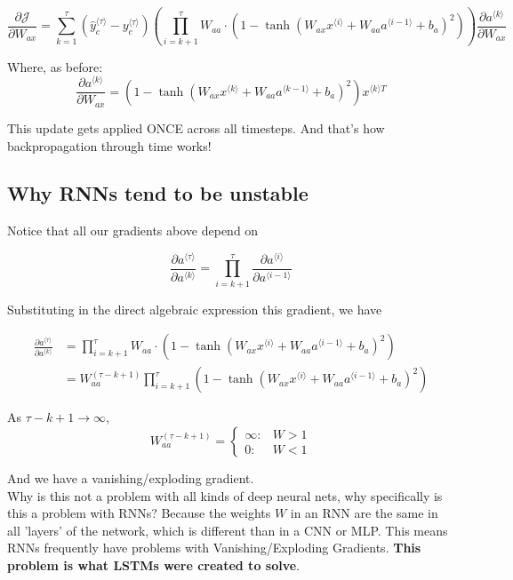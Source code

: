 \documentclass[12pt]{article}
\begin{document}
\[\frac{\partial \mathcal{J}}{\partial W_{ax}} = \sum_{k=1}^{\tau} \left( \hat{y}_c^{\langle \tau \rangle} - y_c^{\langle \tau \rangle}  \right) \left( \prod_{i=k+1}^{\tau}W_{aa} \cdot (1-\tanh(W_{ax}x^{\langle i \rangle} +W_{aa}a^{\langle i-1\rangle}+b_a)^2) \right) \frac{\partial a^{\langle k \rangle}}{\partial W_{ax}}\]

Where, as before: 
\[\frac{\partial a^{\langle k \rangle}}{\partial W_{ax}} = (1 - \tanh(W_{ax}x^{\langle k \rangle} + W_{aa}a^{\langle k-1\rangle} + b_a)^2) x^{\langle k \rangle T}\] 

This update gets applied ONCE across all timesteps. And that's how backpropagation through time works!

\subsection{Why RNNs tend to be unstable}

Notice that all our gradients above depend on 

\[\frac{\partial a^{\langle \tau \rangle}}{\partial a^{\langle k \rangle}} = \prod_{i=k+1}^{\tau} \frac{\partial a ^{\langle i \rangle}}{\partial a ^{\langle i - 1 \rangle}}\]


Substituting in the direct algebraic expression this gradient, we have

\begin{align*}
\frac{\partial a^{\langle \tau \rangle}}{\partial a^{\langle k \rangle}} &= \prod_{i=k+1}^{\tau}W_{aa} \cdot (1-\tanh(W_{ax}x^{\langle i \rangle} +W_{aa}a^{\langle i-1\rangle}+b_a)^2) \\
&= W_{aa}^{(\tau - k + 1)}\prod_{i=k+1}^{\tau}(1-\tanh(W_{ax}x^{\langle i \rangle} +W_{aa}a^{\langle i-1\rangle}+b_a)^2)
\end{align*}

As \(\tau - k + 1 \rightarrow \infty\), 
\[W_{aa}^{(\tau - k + 1)} = \begin{cases} \infty: & W > 1 \\ 0: & W<1 \end{cases}\]

And we have a vanishing/exploding gradient.\\

Why is this not a problem with all kinds of deep neural nets, why specifically is this a problem with RNNs? Because the weights \(W\) in an RNN are the same in all 'layers' of the network, which is different than in a CNN or MLP. This means RNNs frequently have problems with Vanishing/Exploding Gradients.\textbf{ This problem is what LSTMs were created to solve}.
\end{document}
